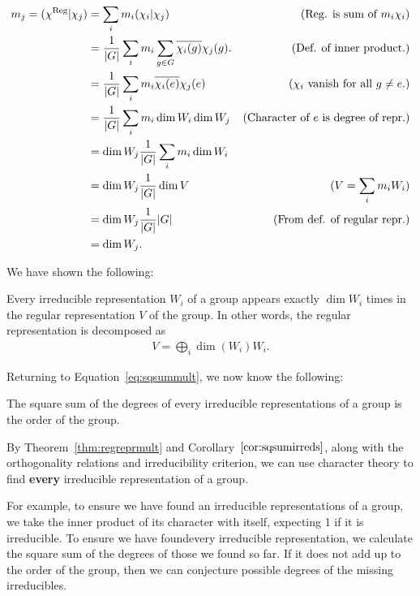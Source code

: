 {\allowdisplaybreaks\begin{align*}
	m_j = (\chi^{\text{Reg}}|\chi_j)  &=  \sum_i m_i  (\chi_i|\chi_j)   & \text{(Reg. is sum of $m_i\chi_i$)}\\
	&= \frac{1}{|G|} \sum_i  m_i \sum_{g \in G} \overline{\chi_i(g) }{\chi_j(g)}. & \text{(Def. of inner product.)} \\
	&=  \frac{1}{|G|}\sum_i  m_i \overline{\chi_i(e) }{\chi_j(e)} & \text{($\chi_i$ vanish for all $g \neq e$.)} \\
	&= \frac{1}{|G|} \sum_i m_i \dim W_i \dim W_j & \text{(Character of $e$ is degree of repr.)} \\
	&= \dim W_j \frac{1}{|G|}  \sum_i m_i \dim W_i  & \\
		&= \dim W_j \frac{1}{|G|} \dim V & \text{($V = \sum_i m_i W_i$)} \\
	&= \dim W_j \frac{1}{|G|}  |G| & \text{(From def. of regular repr.)} \\
	& = \dim W_j.
\end{align*}}

We have shown the following:
\begin{theorem}\label{thm:regreprmult}
	Every irreducible representation $W_i$ of a group appears exactly $\dim W_i$ times in the regular representation $V$ of the group. In other words, the regular representation is decomposed as
	\begin{align*}
		V = \bigoplus_i \dim (W_i) W_i.
	\end{align*}
\end{theorem}

Returning to Equation~\ref{eq:sqsummult},  we now know the following:
\begin{corollary}\label{cor:sqsumirreds}
	The square sum of the degrees of every irreducible representations of a group is the order of the group.
\end{corollary}

\begin{remark}
	By Theorem~\ref{thm:regreprmult} and Corollary~$\ref{cor:sqsumirreds}$, along with the orthogonality relations and irreducibility criterion, we can use character theory to find \textbf{every} irreducible representation of a group. 
\end{remark}

For example, to ensure we have found an irreducible representations of a group, we take the inner product of its character with itself, expecting 1 if it is irreducible. To ensure we have foundevery irreducible representation, we calculate the square sum of the degrees of those we found so far. If it does not add up to the order of the group, then we can conjecture possible degrees of the missing irreducibles.




